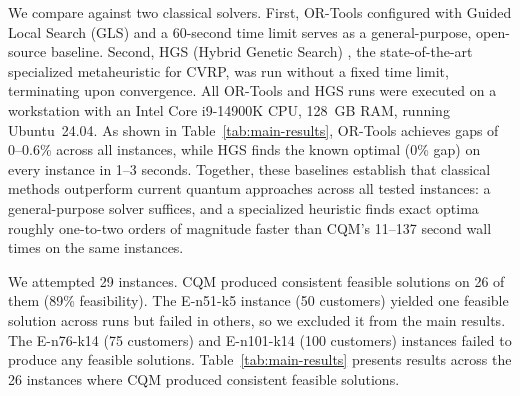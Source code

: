 \documentclass[preprint,3p,12pt,authoryear]{elsarticle}
\begin{document}
{\color{red}We compare against two classical solvers. First, OR-Tools configured with Guided Local Search (GLS) and a 60-second time limit serves as a general-purpose, open-source baseline. Second, HGS (Hybrid Genetic Search) \citep{vidal2022hybrid}, the state-of-the-art specialized metaheuristic for CVRP, was run without a fixed time limit, terminating upon convergence. All OR-Tools and HGS runs were executed on a workstation with an Intel Core i9-14900K CPU, 128~GB RAM, running Ubuntu~24.04. As shown in Table~\ref{tab:main-results}, OR-Tools achieves gaps of 0--0.6\% across all instances, while HGS finds the known optimal (0\% gap) on every instance in 1--3 seconds. Together, these baselines establish that classical methods outperform current quantum approaches across all tested instances: a general-purpose solver suffices, and a specialized heuristic finds exact optima roughly one-to-two orders of magnitude faster than CQM's 11--137 second wall times on the same instances.}

We attempted 29 instances. CQM produced consistent feasible solutions on 26 of them (89\% feasibility). The E-n51-k5 instance (50 customers) yielded one feasible solution across runs but failed in others, so we excluded it from the main results. The E-n76-k14 (75 customers) and E-n101-k14 (100 customers) instances failed to produce any feasible solutions. Table~\ref{tab:main-results} presents results across the 26 instances where CQM produced consistent feasible solutions.
\end{document}
